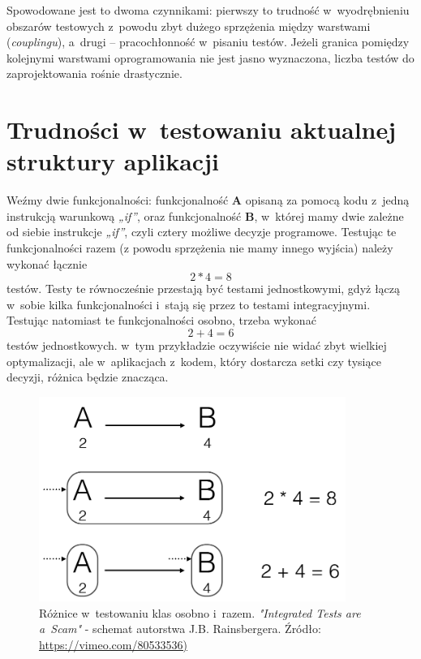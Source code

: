 Spowodowane jest to dwoma czynnikami: pierwszy to trudność w~wyodrębnieniu obszarów testowych z~powodu zbyt dużego sprzężenia między warstwami (\textit{couplingu}), a~drugi – pracochłonność w~pisaniu testów. Jeżeli granica pomiędzy kolejnymi warstwami oprogramowania nie jest jasno wyznaczona, liczba testów do zaprojektowania rośnie drastycznie.

\section{Trudności w~testowaniu aktualnej struktury \newline aplikacji}
\label{testowanie_starej_struktury}

Weźmy dwie funkcjonalności: funkcjonalność \textbf{A} opisaną za pomocą kodu z~jedną instrukcją warunkową \textit{„if”}, oraz funkcjonalność \textbf{B}, w~której mamy dwie zależne od siebie instrukcje \textit{„if”}, czyli cztery możliwe decyzje programowe. Testując te funkcjonalności razem (z powodu sprzężenia nie mamy innego wyjścia) należy wykonać łącznie 
\[2*4=8\]
testów. Testy te równocześnie przestają być testami jednostkowymi, gdyż łączą w~sobie kilka funkcjonalności i~stają się przez to testami integracyjnymi. Testując natomiast te funkcjonalności osobno, trzeba wykonać 
\[2+4=6\]
testów jednostkowych. w~tym przykładzie oczywiście nie widać zbyt wielkiej optymalizacji, ale w~aplikacjach z~kodem, który dostarcza setki czy tysiące decyzji, różnica będzie znacząca.

\begin{figure}[!htb]
    \centering
    \includegraphics[width=10cm]{imgs/ch3_przyklad_testowania_klas.png}
    \caption
{Różnice w~testowaniu klas osobno i~razem. \textit{"Integrated Tests are a~Scam"} - schemat autorstwa J.B. Rainsbergera. Źródło: \url{https://vimeo.com/80533536)}}
    \label{fig:testowanie_klas}
\end{figure} 

